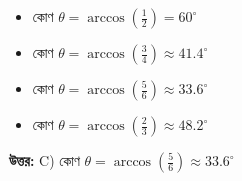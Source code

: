 \documentclass[12pt, a4paper]{article}
\begin{document}
\begin{itemize}[label={}, leftmargin=1cm, itemsep=0.5em]
    \item[\textbf{A)}] কোণ $\theta = \arccos\left(\frac{1}{2}\right) = 60^\circ$
    \item[\textbf{B)}] কোণ $\theta = \arccos\left(\frac{3}{4}\right) \approx 41.4^\circ$
    \item[\textbf{C)}] কোণ $\theta = \arccos\left(\frac{5}{6}\right) \approx 33.6^\circ$
    \item[\textbf{D)}] কোণ $\theta = \arccos\left(\frac{2}{3}\right) \approx 48.2^\circ$
\end{itemize}

\vspace{0.5em}
\begin{tcolorbox}[answerbox]
    \textbf{\color{success} উত্তর:} C) কোণ $\theta = \arccos\left(\frac{5}{6}\right) \approx 33.6^\circ$
\end{tcolorbox}
\vspace{1em}
\end{document}
